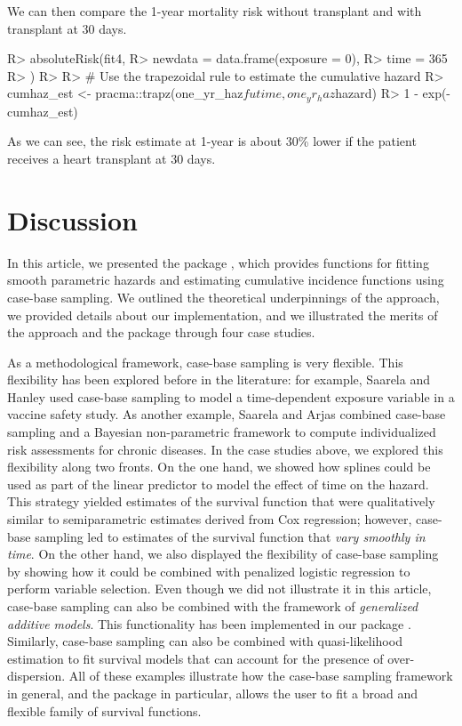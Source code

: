 \documentclass[
]{jss}
\begin{document}
We can then compare the 1-year mortality risk without transplant and
with transplant at 30 days.

\begin{CodeChunk}

\begin{CodeInput}
R> absoluteRisk(fit4,
R>   newdata = data.frame(exposure = 0),
R>   time = 365
R> )
R> 
R> # Use the trapezoidal rule to estimate the cumulative hazard
R> cumhaz_est <- pracma::trapz(one_yr_haz$futime, one_yr_haz$hazard)
R> 1 - exp(-cumhaz_est)
\end{CodeInput}
\end{CodeChunk}

As we can see, the risk estimate at 1-year is about 30\% lower if the
patient receives a heart transplant at 30 days.

\hypertarget{discussion}{%
\section{Discussion}\label{discussion}}

In this article, we presented the  package ,
which provides functions for fitting smooth parametric hazards and
estimating cumulative incidence functions using case-base sampling. We
outlined the theoretical underpinnings of the approach, we provided
details about our implementation, and we illustrated the merits of the
approach and the package through four case studies.

As a methodological framework, case-base sampling is very flexible. This
flexibility has been explored before in the literature: for example,
Saarela and Hanley \citeyearpar{saarela2015case} used case-base sampling
to model a time-dependent exposure variable in a vaccine safety study.
As another example, Saarela and Arjas \citeyearpar{saarela2015non}
combined case-base sampling and a Bayesian non-parametric framework to
compute individualized risk assessments for chronic diseases. In the
case studies above, we explored this flexibility along two fronts. On
the one hand, we showed how splines could be used as part of the linear
predictor to model the effect of time on the hazard. This strategy
yielded estimates of the survival function that were qualitatively
similar to semiparametric estimates derived from Cox regression;
however, case-base sampling led to estimates of the survival function
that \emph{vary smoothly in time}. On the other hand, we also displayed
the flexibility of case-base sampling by showing how it could be
combined with penalized logistic regression to perform variable
selection. Even though we did not illustrate it in this article,
case-base sampling can also be combined with the framework of
\emph{generalized additive models}. This functionality has been
implemented in our package . Similarly, case-base sampling
can also be combined with quasi-likelihood estimation to fit survival
models that can account for the presence of over-dispersion. All of
these examples illustrate how the case-base sampling framework in
general, and the package  in particular, allows the user
to fit a broad and flexible family of survival functions.
\end{document}
